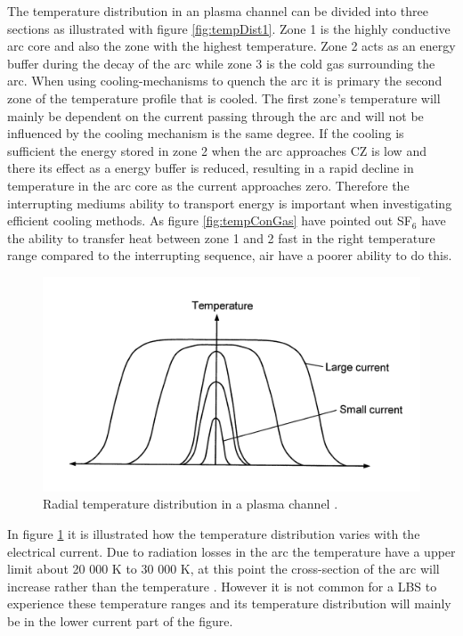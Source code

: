 \documentclass[10pt,a4paper]{article} %
\begin{document}
The temperature distribution in an plasma channel can be divided into three sections \cite{bib:TDCIGBB} as illustrated with figure \ref{fig:tempDist1}. Zone 1 is the highly conductive arc core and also the zone with the highest temperature. Zone 2 acts as an energy buffer during the decay of the arc while zone 3 is the cold gas surrounding the arc. When using cooling-mechanisms to quench the arc it is primary the second zone of the temperature profile that is cooled. The first zone's temperature will mainly be dependent on the current passing through the arc and will not be influenced by the cooling mechanism is the same degree. If the cooling is sufficient the energy stored in zone 2 when the arc approaches CZ is low and there its effect as a energy buffer is reduced, resulting in a rapid decline in temperature in the arc core as the current approaches zero. Therefore the interrupting mediums ability to transport energy is important when investigating efficient cooling methods. As figure \ref{fig:tempConGas} have pointed out SF$_6$ have the ability to transfer heat between zone 1 and 2 fast in the right temperature range compared to the interrupting sequence, air have a poorer ability to do this.

\begin{figure}[H]
\centering
\includegraphics[scale=0.8]{Bilder/Theory/plasmaChannel1.png}
\caption{Radial temperature distribution in a plasma channel \cite{bib:HVEbreak}.} \label{fig:tempDist2}
\end{figure}

In figure \ref{fig:tempDist2} it is illustrated how the temperature distribution varies with the electrical current. Due to radiation losses in the arc the temperature have a upper limit about 20 000 K to 30 000 K, at this point the cross-section of the arc will increase rather than the temperature \cite{bib:HVEbreak}. However it is not common for a LBS to experience these temperature ranges and its temperature distribution will mainly be in the lower current part of the figure.
\end{document}
